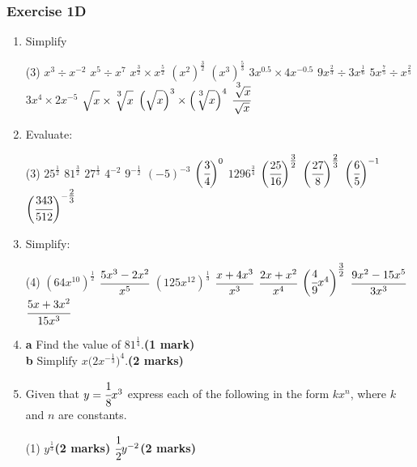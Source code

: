\documentclass[fleqn]{article}
\newcommand{\exercise}{\subsubsection}
\begin{document}
\exercise{Exercise 1D}
\begin{enumerate}
	\item Simplify
		\begin{tasks}(3) %
			\task $x^3 \div x^{-2}$
			\task $x^5 \div x^7$
			\task $x^{\textstyle\frac{3}{2}} \times x^{\textstyle\frac{5}{2}}$
			\task $(x^2)^{\textstyle\frac{3}{2}}$
			\task $(x^3)^{\textstyle\frac{5}{3}}$
			\task $3x^{0.5} \times 4x^{-0.5}$
			\task $9x^{\textstyle\frac{2}{3}} \div 3x^{\textstyle\frac{1}{6}}$
			\task $5x^{\textstyle\frac{7}{5}} \div x^{\textstyle\frac{2}{5}}$
			\task $3x^4 \times 2x^{-5}$
			\task $\sqrt{\strut x} \times \sqrt[\textstyle{^3}]{\strut x}$
			\task $\Big(\sqrt{\strut x}\Big)^3 \times \Big(\sqrt[\textstyle{^3}]{\strut x}\Big)^4$
			\task $\cfrac{\sqrt[\textstyle{^3}]{ x}}{\sqrt{x}}$
		\end{tasks}
	\item Evaluate:
		\begin{tasks}(3)%
			\task $25^{\textstyle\frac{1}{2}}$
			\task $81^{\textstyle\frac{3}{2}}$
			\task $27^{\textstyle\frac{1}{3}}$
			\task $4^{-2}$
			\task $9^{-\textstyle\frac{1}{2}}$
			\task $(-5)^{-3}$
			\task $\bigg(\cfrac{3}{4}\bigg)^0$
			\task $1296^{\textstyle\frac{3}{4}}$
			\task $\bigg(\cfrac{25}{16}\bigg)^{\textstyle\frac{3}{2}}$
			\task $\bigg(\cfrac{27}{8}\bigg)^{\textstyle\frac{2}{3}}$
			\task $\bigg(\cfrac{6}{5}\bigg)^{-1}$
			\task $\bigg(\cfrac{343}{512}\bigg)^{-\textstyle\frac{2}{3}}$
		\end{tasks}
		\newpage
	\item Simplify:
		\vspace{-2mm}
		\begin{tasks}(4) %
			\task $(64x^{10})^{\textstyle\frac{1}{2}}$
			\task $\cfrac{5x^3-2x^2}{x^5}$
			\task $(125x^{12})^{\textstyle\frac{1}{3}}$
			\task $\cfrac{x+4x^3}{x^3}$
			\task $\cfrac{2x+x^2}{x^4}$
			\task $\bigg(\cfrac{4}{9}x^4\bigg)^{\textstyle\frac{3}{2}}$
			\task $\cfrac{9x^2-15x^5}{3x^3}$
			\task $\cfrac{5x+3x^2}{15x^3}$
		\end{tasks}
	\item \hspace*{2mm}\textbf{a}\hspace*{5mm} Find the value of $81^{\textstyle\frac{1}{4}}$.\hfill\textbf{(1 mark)}\vspace{1mm}\\
		  \hspace*{2mm}\textbf{b}\hspace*{5mm} Simplify $x\Big(2x^{-\textstyle\frac{1}{3}}\Big)^4$.\hfill\textbf{(2 marks)}
	\item Given that $y=\cfrac{1}{8}x^3$ express each of the following in the form $kx^n$, where $k$ and $n$ are constants.\vspace{-2mm}
		\begin{tasks}(1)
			\task $y^{\textstyle\frac{1}{3}}$\hfill\textbf{(2 marks)}\vspace{-1mm}
			\task $\cfrac{1}{2}y^{-2}$\hfill\textbf{(2 marks)}
		\end{tasks}
\end{enumerate}
\end{document}
